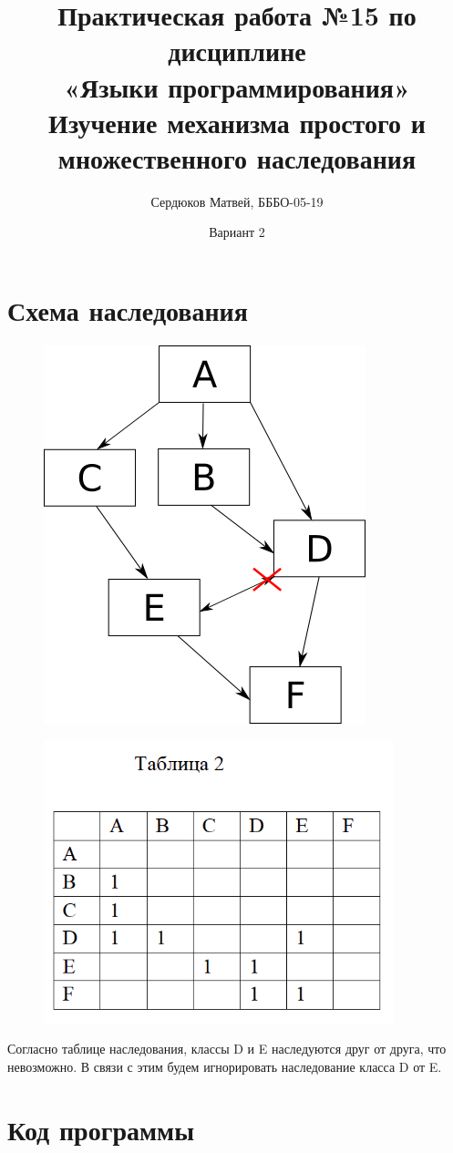 \documentclass[a4paper,12pt]{article}
\title{Практическая работа №15 по дисциплине\\«Языки программирования»\\Изучение механизма простого и множественного наследования}
\author{Сердюков Матвей, БББО-05-19}
\date{Вариант 2}
\begin{document}
	\maketitle
	\section{Схема наследования}
	\begin{figure}[h]
			\includegraphics[scale=0.8]{scheme.png}
			\centering
	\end{figure}
	\begin{figure}[h]
			\includegraphics[scale=0.45]{table.png}
			\centering
	\end{figure}
	\noindent
	Согласно таблице наследования, классы D и E наследуются друг от друга, что невозможно. В связи с этим будем игнорировать наследование класса D от E.
	\newpage
	\section{Код программы}
	
\end{document}
